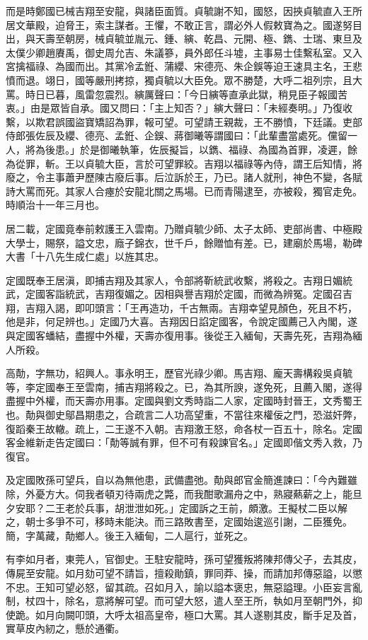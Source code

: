 \begin{pinyinscope}
而是時鄭國已械吉翔至安龍，與諸臣面質。貞毓謝不知，國怒，因挾貞毓直入王所居文華殿，迫脅王，索主謀者。王懼，不敢正言，謂必外人假敕寶為之。國遂努目出，與天壽至朝房，械貞毓並胤元、鍾、縯、乾昌、元開、極、鐫、士瑞、東旦及太僕少卿趙賡禹，御史周允吉、朱議篸，員外郎任斗墟，主事易士佳繫私室。又入宮擒福祿、為國而出。其黨冷孟銋、蒲纓、宋德亮、朱企鋘等迫王速具主名，王悲憤而退。翊日，國等嚴刑拷掠，獨貞毓以大臣免。眾不勝楚，大呼二祖列宗，且大罵。時日已暮，風雷忽震烈。縯厲聲曰：「今日縯等直承此獄，稍見臣子報國苦衷。」由是眾皆自承。國又問曰：「主上知否？」縯大聲曰：「未經奏明。」乃復收繫，以欺君誤國盜寶矯詔為罪，報可望。可望請王親裁，王不勝憤，下廷議。吏部侍郎張佐辰及纓、德亮、孟銋、企鋘、蔣御曦等謂國曰：「此輩盡當處死。儻留一人，將為後患。」於是御曦執筆，佐辰擬旨，以鐫、福祿、為國為首罪，凌遲，餘為從罪，斬。王以貞毓大臣，言於可望罪絞。吉翔以福祿等內侍，謂王后知情，將廢之，令主事蕭尹歷陳古廢后事。后泣訴於王，乃已。諸人就刑，神色不變，各賦詩大罵而死。其家人合瘞於安龍北關之馬場。已而青陽逮至，亦被殺，獨官走免。時順治十一年三月也。

居二載，定國竟奉前敕護王入雲南。乃贈貞毓少師、太子太師、吏部尚書、中極殿大學士，賜祭，謚文忠，廕子錦衣，世千戶，餘贈恤有差。已，建廟於馬場，勒碑大書「十八先生成仁處」以旌其忠。

定國既奉王居滇，即捕吉翔及其家人，令部將靳統武收繫，將殺之。吉翔日媚統武，定國客詣統武，吉翔復媚之。因相與譽吉翔於定國，而微為辨冤。定國召吉翔，吉翔入謁，即叩頭言：「王再造功，千古無兩。吉翔幸望見顏色，死且不朽，他是非，何足辨也。」定國乃大喜。吉翔因日諂定國客，令說定國薦己入內閣，遂與定國客蟠結，盡握中外權，天壽亦復用事。後從王入緬甸，天壽先死，吉翔為緬人所殺。

高勣，字無功，紹興人。事永明王，歷官光祿少卿。馬吉翔、龐天壽構殺吳貞毓等，李定國奉王至雲南，捕吉翔將殺之。已，為其所諛，遂免死，且薦入閣，遂得盡握中外權，而天壽亦用事。定國與劉文秀時詣二人家，定國時封晉王，文秀蜀王也。勣與御史鄔昌期患之，合疏言二人功高望重，不當往來權佞之門，恐滋奸弊，復蹈秦王故轍。疏上，二王遂不入朝。吉翔激王怒，命各杖一百五十，除名。定國客金維新走告定國曰：「勣等誠有罪，但不可有殺諫官名。」定國即偕文秀入救，乃復官。

及定國敗孫可望兵，自以為無他患，武備盡弛。勣與郎官金簡進諫曰：「今內難雖除，外憂方大。伺我者頓刃待兩虎之斃，而我酣歌漏舟之中，熟寢爇薪之上，能旦夕安耶？二王老於兵事，胡泄泄如死。」定國訴之王前，頗激。王擬杖二臣以解之，朝士多爭不可，移時未能決。而三路敗書至，定國始逡巡引謝，二臣獲免。簡，字萬藏，勣鄉人。後王入緬甸，二人扈行，並死之。

有李如月者，東莞人，官御史。王駐安龍時，孫可望獲叛將陳邦傳父子，去其皮，傳屍至安龍。如月劾可望不請旨，擅殺勛鎮，罪同莽、操，而請加邦傳惡謚，以懲不忠。王知可望必怒，留其疏。召如月入，諭以謚本褒忠，無惡謚理。小臣妄言亂制，杖四十，除名，意將解可望。而可望大怒，遣人至王所，執如月至朝門外，抑使跪。如月向闕叩頭，大呼太祖高皇帝，極口大罵。其人遂剔其皮，斷手足及首，實草皮內紉之，懸於通衢。


\end{pinyinscope}
